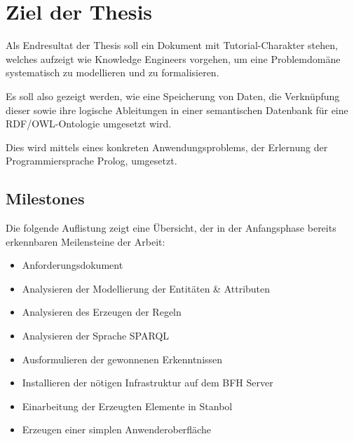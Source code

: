 \chapter{Ziel der Thesis}
\label{chap:thesisziel}
Als Endresultat der Thesis soll ein Dokument mit Tutorial-Charakter stehen, welches aufzeigt wie Knowledge Engineers vorgehen, um eine Problemdomäne systematisch zu modellieren und zu formalisieren.

Es soll also gezeigt werden, wie eine Speicherung von Daten, die Verknüpfung dieser sowie ihre logische Ableitungen in einer semantischen Datenbank für eine RDF/OWL-Ontologie umgesetzt wird.~\cite{Aufgabenstellung}

Dies wird mittels eines konkreten Anwendungsproblems, der Erlernung der Programmiersprache Prolog, umgesetzt.

\section{Milestones}
\label{sec:Milestones}
Die folgende Auflistung zeigt eine Übersicht, der in der Anfangsphase bereits erkennbaren Meilensteine der Arbeit:
\begin{itemize}
	\item Anforderungsdokument \\
	\item Analysieren der Modellierung der Entitäten & Attributen \\
	\item Analysieren des Erzeugen der Regeln \\
	\item Analysieren der Sprache SPARQL \\
	\item Ausformulieren der gewonnenen Erkenntnissen \\
	\item Installieren der nötigen Infrastruktur auf dem BFH Server\\
	\item Einarbeitung der Erzeugten Elemente in Stanbol \\
	\item Erzeugen einer simplen Anwenderoberfläche \\
\end{itemize}

